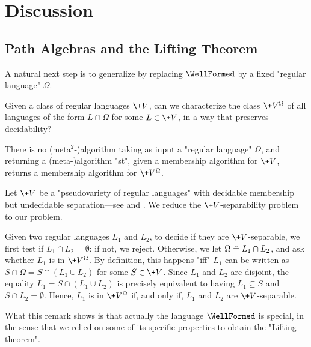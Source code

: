 \section{Discussion}
\label{sec:algebra-discussion}

\subsection{Path Algebras and the Lifting Theorem}

A natural next step is to generalize  by replacing
$\WellFormed$ by a fixed "regular language" $\Omega$.

\begin{question}
	Given a class of regular languages $\+V$, can we characterize the class $\+V^\Omega$
	of all languages of the form $L \cap \Omega$ for some $L \in \+V$, in a way that preserves decidability?
\end{question}

\begin{remark}
	\label{rk:no-algo-lifting}
	There is no (meta$^2$-)algorithm taking as input a "regular language" $\Omega$,
	and returning a (meta-)algorithm "st", given
	a membership algorithm for $\+V$, returns a membership algorithm
	for $\+V^\Omega$.

	Let $\+V$ be a "pseudovariety of regular languages" with
	decidable membership but undecidable separation---see
	\cite[Corollary 1.6, p.~478]{Rhode2011Pointlike} and .
	We reduce the $\+V$-separability problem to our problem.

	Given two regular languages $L_1$ and $L_2$, to decide if they are $\+V$-separable,
	we first test if $L_1 \cap L_2 = \emptyset$: if not, we reject.
	Otherwise, we let $\Omega \mathrel{\hat{=}} L_1 \cap L_2$, and ask whether
	$L_1$ is in $\+V^\Omega$.
	By definition, this happens "iff" $L_1$ can be written as
	$S \cap \Omega = S \cap (L_1 \cup L_2)$ for some $S \in \+V$.
	Since $L_1$ and $L_2$ are disjoint, the equality $L_1 = S \cap (L_1 \cup L_2)$
	is precisely equivalent to having $L_1 \subseteq S$ and $S \cap L_2 = \emptyset$.
	Hence, $L_1$ is in $\+V^\Omega$ if, and only if, $L_1$ and $L_2$ are $\+V$-separable.
\end{remark}

What this remark shows is that actually the language $\WellFormed$ is special,
in the sense that we relied on some of its specific properties to obtain the "Lifting theorem".


